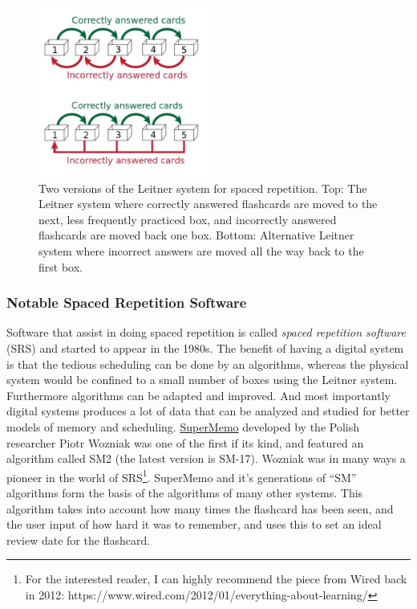 \begin{figure}
\centering
\includegraphics[width=0.50000\textwidth]{assets/leitner.jpg}
\caption{Two versions of the Leitner system for spaced repetition. Top:
The Leitner system where correctly answered flashcards are moved to the
next, less frequently practiced box, and incorrectly answered flashcards
are moved back one box. Bottom: Alternative Leitner system where
incorrect answers are moved all the way back to the first
box.}\label{fig:leitner}
\end{figure}

\subsubsection{Notable Spaced Repetition
Software}\label{notable-spaced-repetition-software}

Software that assist in doing spaced repetition is called \emph{spaced
repetition software} (SRS) and started to appear in the 1980s. The
benefit of having a digital system is that the tedious scheduling can be
done by an algorithms, whereas the physical system would be confined to
a small number of boxes using the Leitner system. Furthermore algorithms
can be adapted and improved. And most importantly digital systems
produces a lot of data that can be analyzed and studied for better
models of memory and scheduling.
\href{https://www.supermemo.com}{SuperMemo} developed by the Polish
researcher Piotr Wozniak was one of the first if its kind, and featured
an algorithm called SM2 (the latest version is SM-17). Wozniak was in
many ways a pioneer in the world of SRS\footnote{For the interested
  reader, I can highly recommend the piece from Wired back in 2012:
  https://www.wired.com/2012/01/everything-about-learning/}. SuperMemo
and it's generations of ``SM'' algorithms form the basis of the
algorithms of many other systems. This algorithm takes into account how
many times the flashcard has been seen, and the user input of how hard
it was to remember, and uses this to set an ideal review date for the
flashcard.

